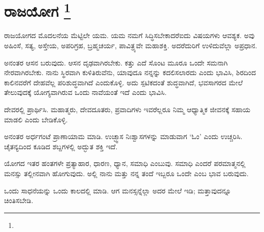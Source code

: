 
\vspace{-0.5cm}

\chapter[ರಾಜಯೋಗ ]{ರಾಜಯೋಗ \protect\footnote{}}

ರಾಜಯೋಗದ ಮೊದಲನೆಯ ಮೆಟ್ಟಿಲೇ ಯಮ. ಯಮ ನಮಗೆ ಸಿದ್ಧಿಸಬೇಕಾದರೆ\break ಐದು ವಿಷಯಗಳು ಆವಶ್ಯಕ. ಅವು ಅಹಿಂಸೆ, ಸತ್ಯ, ಅಸ್ತೇಯ, ಅಪರಿಗ್ರಹ, ಬ್ರಹ್ಮಚರ್ಯ, ಪಾವಿತ್ರ್ಯವೇ ಮಹಾಶಕ್ತಿ. ಅದರೆದುರಿಗೆ ಉಳಿದುವೆಲ್ಲಾ ಅಪ್ರಧಾನ.

ಅನಂತರ ಆಸನ ಬರುವುದು. ಆಸನ ದೃಢವಾಗಿರಬೇಕು. ಕತ್ತು ಎದೆ ಸೊಂಟ ಮೂರೂ ಒಂದೇ ಸಮನಾಗಿ ನೇರವಾಗಿರಬೇಕು. ನಾನು ಸ್ಥಿರವಾಗಿ ಕುಳಿತಿರುವೆನು, ಯಾವುದೂ ನನ್ನನ್ನು ಕದಲಿಸಲಾರದು ಎಂದು ಭಾವಿಸಿ, ಶಿರದಿಂದ ಕಾಲಿನವರೆಗೆ ದೇಹವೆಲ್ಲ ಪರಿಶುದ್ಧವಾಗಿದೆ ಎಂದುಕೊಳ್ಳಿ. ಅದು ಸ್ಪಟಿಕದಂತೆ ಶುದ್ಧವಾಗಿದೆ, ಭವಸಾಗರದ ಮೇಲೆ ತೇಲುವುದಕ್ಕೆ ಯೋಗ್ಯವಾಗಿರುವ ಒಂದು ನಾವೆಯಂತೆ ಇದೆ ಎಂದು ಭಾವಿಸಿ.

ದೇವರಲ್ಲಿ ಪ್ರಾರ್ಥಿಸಿ. ಮಹಾತ್ಮರು, ದೇವದೂತರು, ಪ್ರವಾದಿಗಳು ಇವರೆಲ್ಲರೂ ನಿಮ್ಮ ಆಧ್ಯಾತ್ಮಿಕ ಜೀವನಕ್ಕೆ ಸಹಾಯ ಮಾಡಲಿ ಎಂದು ಬೇಡಿಕೊಳ್ಳಿ.

ಅನಂತರ ಅರ್ಧಗಂಟೆ ಪ್ರಾಣಾಯಾಮ ಮಾಡಿ. ಉಚ್ಛ್ವಾಸ ನಿಃಶ್ವಾಸಗಳನ್ನು ಮಾಡುವಾಗ ‘ಓಂ’ ಎಂದು ಉಚ್ಚರಿಸಿ. ಚೈತನ್ಯದಿಂದ ಕೂಡಿದ ಶಬ್ದಗಳಲ್ಲಿ ಅದ್ಭುತ ಶಕ್ತಿ ಇದೆ.

ಯೋಗದ ಇತರ ಹಂತಗಳೇ ಪ್ರತ್ಯಾಹಾರ, ಧಾರಣ, ಧ್ಯಾನ, ಸಮಾಧಿ ಎಂಬುವು. ಸಮಾಧಿ ಎಂದರೆ ಪರಮಾತ್ಮನಲ್ಲಿ ಮನಸ್ಸು ತಲ್ಲೀನವಾಗಿ ಹೋಗುವುದು. ಅಲ್ಲಿ ನಾನು ಮತ್ತು ನನ್ನ ತಂದೆ ಇಬ್ಬರೂ ಒಂದೇ ಎಂಬ ಭಾವ ಬರುವುದು.

ಒಂದು ಸಾಧನೆಯನ್ನು ಒಂದು ಕಾಲದಲ್ಲಿ ಮಾಡಿ. ಆಗ ಮನಸ್ಸನ್ನೆಲ್ಲಾ ಅದರ ಮೇಲೆ ಇಡಿ; ಮತ್ತಾವುದನ್ನೂ ಚಿಂತಿಸಬೇಡಿ.

